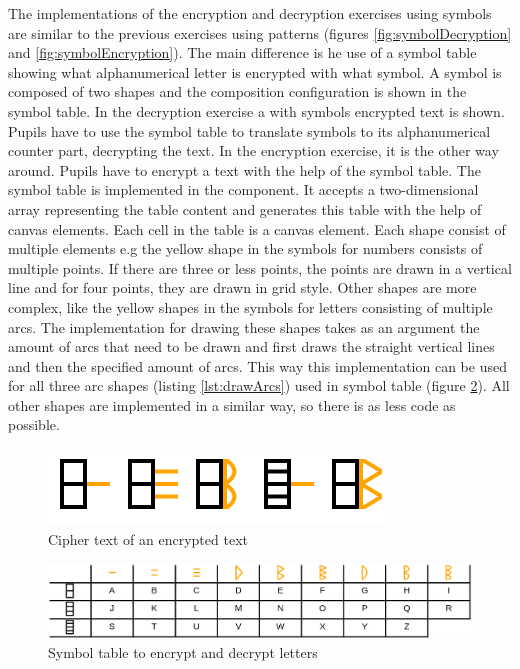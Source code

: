 The implementations of the encryption and decryption exercises using symbols are similar to the previous exercises using patterns (figures \ref{fig:symbolDecryption} and \ref{fig:symbolEncryption}). The main difference is he use of a symbol table showing what alphanumerical letter is encrypted with what symbol. A symbol is composed of two shapes and the composition configuration is shown in the symbol table. In the decryption exercise a with symbols encrypted text is shown. Pupils have to use the symbol table to translate symbols to its alphanumerical counter part, decrypting the text. In the encryption exercise, it is the other way around. Pupils have to encrypt a text with the help of the symbol table.
The symbol table is implemented in the  component. It accepts a two-dimensional array representing the table content and generates this table with the help of canvas elements. Each cell in the table is a canvas element. Each shape consist of multiple elements e.g the yellow shape in the symbols for numbers consists of multiple points. If there are three or less points, the points are drawn in a vertical line and for four points, they are drawn in grid style. Other shapes are more complex, like the yellow shapes in the symbols for letters consisting of multiple arcs. The implementation for drawing these shapes takes as an argument the amount of arcs that need to be drawn and first draws the straight vertical lines and then the specified amount of arcs. This way this implementation can be used for all three arc shapes (listing \ref{lst:drawArcs}) used in symbol table (figure \ref{fig:symboltable_letters}). 
All other shapes are implemented in a similar way, so there is as less code as possible.

\begin{figure} 
    \centering
    \includegraphics[width=0.4 \columnwidth]{figures/cipher_text.png}
    \caption{Cipher text of an encrypted text} 
    \label{fig:cipher_text} 
\end{figure}

\begin{figure} 
    \centering
    \includegraphics[width=1.0 \columnwidth]{figures/symboltable_letters.png}
    \caption{Symbol table to encrypt and decrypt letters} 
    \label{fig:symboltable_letters} 
\end{figure}


